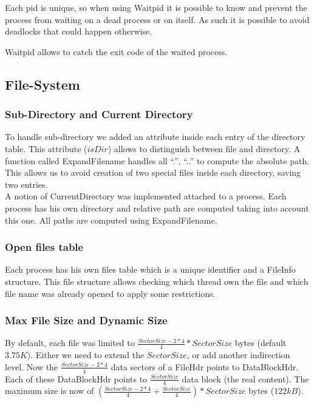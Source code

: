 Each pid is unique, so when using Waitpid it is possible to know and prevent the
process from waiting on a dead process or on itself. As such it is possible
to avoid deadlocks that could happen otherwise.

Waitpid allows to catch the exit code of the waited process.

\subsection{File-System}

\subsubsection{Sub-Directory and Current Directory}

To handle sub-directory we added an attribute inside each entry of the directory
table. This attribute ($isDir$) allows to distinguish between file and
directory. A function called \textrm{ExpandFilename} handles all ``.'', ``..'' to
compute the absolute path. This allows us to avoid creation of two special files
inside each directory,
saving two entries.\\

A notion of CurrentDirectory was implemented attached to a process. Each process
has his own directory and relative path are computed taking into account this
one. All paths are computed using ExpandFilename.

\subsubsection{Open files table}
Each process has his own files table which is a unique identifier and a
FileInfo structure. This file structure allows checking which thread own the
file and which file name was already opened to apply some restrictions.

\subsubsection{Max File Size and Dynamic Size}
By default, each file was limited to $\frac{SectorSize - 2*4}{4} * SectorSize$
bytes (default $3.75K$). Either we need to extend the $SectorSize$, or add another
indirection level.
Now the $\frac{SectorSize - 2*4}{4}$ data sectors of a FileHdr points to
DataBlockHdr. Each of these DataBlockHdr points to $\frac{SectorSize}{4}$ data
block (the real content).
The maximum size is now of $(\frac{SectorSize - 2*4}{4} +
\frac{SectorSize}{4})*SectorSize$ bytes ($122kB$).\\

